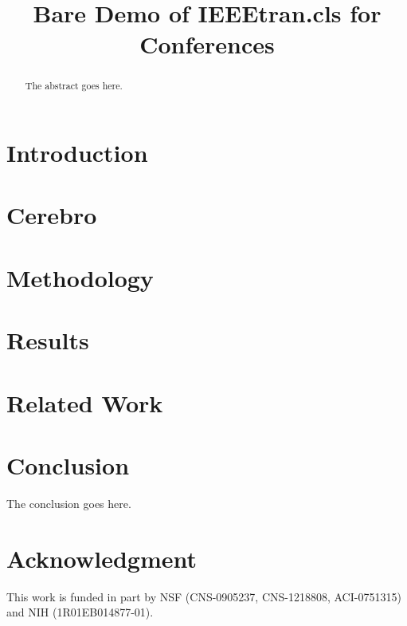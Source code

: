 \documentclass[conference,compsoc]{IEEEtran}
\begin{document}
%
\title{Bare Demo of IEEEtran.cls for Conferences}

\author{
}

\maketitle


\begin{abstract}
The abstract goes here.
\end{abstract}

\section{Introduction}
\label{sec:intro}


\section{Cerebro}
\label{sec:cerebro}


\section{Methodology}
\label{sec:methodology}


\section{Results}
\label{sec:results}


\section{Related Work}
\label{sec:related_work}


\section{Conclusion}
The conclusion goes here.

\section*{Acknowledgment}
This work is funded in part by NSF (CNS-0905237, CNS-1218808, ACI-0751315) and NIH
(1R01EB014877-01).



\end{document}
